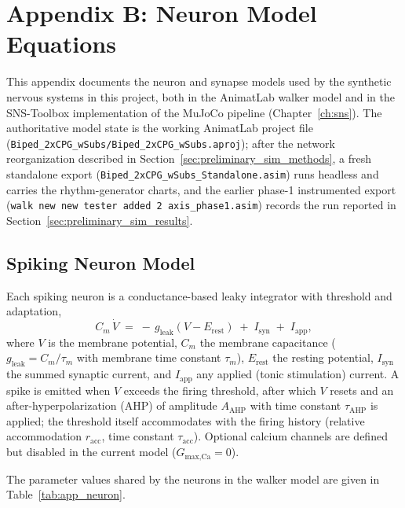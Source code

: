 \chapter{Appendix B: Neuron Model Equations}\label{app:neuron_equations}
\graphicspath{{../Figures/93-AppendixB/}{figs/93-AppendixB/}}

This appendix documents the neuron and synapse models used by the synthetic nervous systems in this project, both in the AnimatLab walker model and in the SNS-Toolbox implementation of the MuJoCo pipeline (Chapter~\ref{ch:sns}). The authoritative model state is the working AnimatLab project file (\texttt{Biped\_2xCPG\_wSubs/Biped\_2xCPG\_wSubs.aproj}); after the network reorganization described in Section~\ref{sec:preliminary_sim_methods}, a fresh standalone export (\texttt{Biped\_2xCPG\_wSubs\_Standalone.asim}) runs headless and carries the rhythm-generator charts, and the earlier phase-1 instrumented export (\texttt{walk new new tester added 2 axis\_phase1.asim}) records the run reported in Section~\ref{sec:preliminary_sim_results}.

\section{Spiking Neuron Model}

Each spiking neuron is a conductance-based leaky integrator with threshold and adaptation,
\begin{equation}
    C_{m}\,\dot{V} \;=\; -\,g_{\text{leak}}\left(V - E_{\text{rest}}\right)
                      \;+\; I_{\text{syn}} \;+\; I_{\text{app}},
    \label{eq:app_membrane}
\end{equation}
where $V$ is the membrane potential, $C_{m}$ the membrane capacitance ($g_{\text{leak}} = C_{m}/\tau_{m}$ with membrane time constant $\tau_{m}$), $E_{\text{rest}}$ the resting potential, $I_{\text{syn}}$ the summed synaptic current, and $I_{\text{app}}$ any applied (tonic stimulation) current. A spike is emitted when $V$ exceeds the firing threshold, after which $V$ resets and an after-hyperpolarization (AHP) of amplitude $A_{\text{AHP}}$ with time constant $\tau_{\text{AHP}}$ is applied; the threshold itself accommodates with the firing history (relative accommodation $r_{\text{acc}}$, time constant $\tau_{\text{acc}}$). Optional calcium channels are defined but disabled in the current model ($G_{\text{max,Ca}} = 0$).

The parameter values shared by the neurons in the walker model are given in Table~\ref{tab:app_neuron}.

